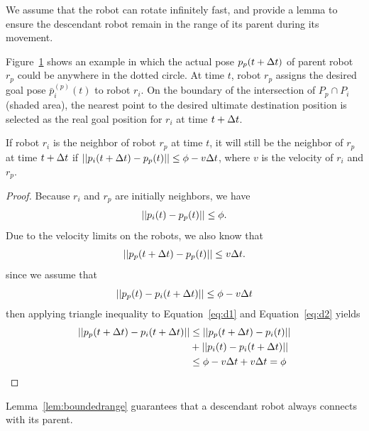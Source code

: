 We assume that the robot can rotate infinitely fast, and provide a lemma to ensure the descendant robot remain in the range of its parent during its movement. 

Figure~\ref{fig:boundedrange} shows an example in which the actual
pose $p_p(t+\Delta t)$ of parent robot $r_p$ could be anywhere in the dotted
circle. 
%
At time $t$, robot $r_p$ assigns the desired goal pose $\bar{p}_i^{(p)}(t)$ to robot $r_i$.  
%
On the boundary of the intersection of $P_p \cap P_i$ (shaded area),
the nearest point to the desired ultimate destination position is
selected as the real goal position for $r_i$ at time $t+\Delta t$.

\begin{lem}
  \label{lem:boundedrange}
  If robot $r_i$ is the neighbor of robot $r_p$ at time $t$, it will still be the 
  neighbor of $r_p$ at time $t + \Delta t$ if $|| p_i(t+\Delta t) - p_p(t) || \leq \phi -  v\Delta t$, where $v$ is the velocity of $r_i$ and $r_p$. 
\end{lem}

\begin{proof}
Because $r_i$ and $r_p$ are initially neighbors, we have
  \begin{equation}
    || p_i(t) - p_p(t) || \leq \phi.
  \end{equation}
Due to the velocity limits on the robots, we also know that
  \begin{equation}\label{eq:d1}
    || p_p(t+\Delta t)- p_p(t) ||\leq v\Delta t.
  \end{equation}
since we assume that 
  \begin{equation}\label{eq:d2}
    || p_p(t) - p_i(t+\Delta t) || \leq \phi - v\Delta t
  \end{equation}
then applying triangle inequality to Equation~\ref{eq:d1} and Equation~\ref{eq:d2} yields
  \begin{eqnarray*}
  \label{eq:d3}
    || p_p(t+\Delta t) - p_i(t+\Delta t) || & \leq || p_p(t+\Delta t) - p_i(t)|| \\
      & + || p_i(t) - p_i(t+\Delta t)|| \\
      & \leq \phi - v\Delta t + v\Delta t = \phi
  \end{eqnarray*}
\end{proof}
\begin{figure}
    \centering
    
    \label{fig:boundedrange}
\end{figure}

Lemma~\ref{lem:boundedrange} guarantees that a descendant robot always connects with its parent. 

